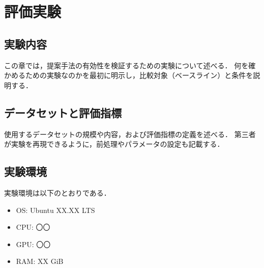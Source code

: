 \documentclass[main]{subfiles}
\begin{document}
\chapter{評価実験}
\label{chap:experiment}
\section{実験内容}
\label{sec:experiment}
この章では，提案手法の有効性を検証するための実験について述べる．
何を確かめるための実験なのかを最初に明示し，比較対象（ベースライン）と条件を説明する．\par

\section{データセットと評価指標}
使用するデータセットの規模や内容，および評価指標の定義を述べる．
第三者が実験を再現できるように，前処理やパラメータの設定も記載する．

\section{実験環境}
実験環境は以下のとおりである．
\begin{itemize}
  \item OS: Ubuntu XX.XX LTS
  \item CPU: 〇〇
  \item GPU: 〇〇
  \item RAM: XX GiB
\end{itemize}
\end{document}
